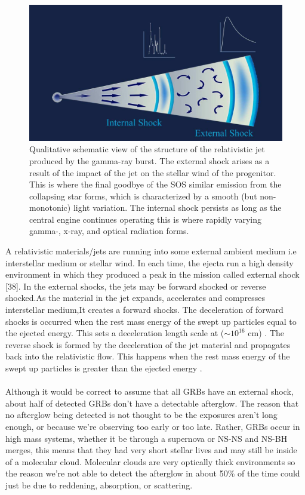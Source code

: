 \begin{figure}[h]
\begin{center}
\includegraphics[scale=0.3]{Figures/fig7.png}
\caption{Qualitative schematic view of the structure of the relativistic jet produced by the gamma-ray burst. The external shock arises as a result of the impact of the jet on the stellar wind of the progenitor. This is where the final goodbye of the SOS
similar emission from the collapsing star forms, which is characterized by a smooth (but non-monotonic) light variation. The internal shock persists as long as the central engine continues operating this is where rapidly varying gamma-, x-ray, and
optical radiation forms.}
\end{center}
\end{figure}
A relativistic materials/jets are running into some external ambient medium i.e interstellar medium or stellar wind. In each time, the ejecta run a high density environment in which they produced a peak in the mission called external shock [38]. In the external shocks, the jets may be forward shocked or reverse shocked.As the material in the jet expands, accelerates and compresses interstellar medium,It creates a forward shocks. The deceleration of forward shocks is occurred when the rest mass energy of the swept up particles equal to the ejected energy. This sets a deceleration length scale at ($\sim  10^{16} $ cm) . The reverse shock is formed by the deceleration of the jet material and propagates back into the relativistic flow. This happens when the rest mass energy of the swept up particles is greater than the ejected energy \citep{20}.\\\\
Although it would be correct to assume that all GRBs have an external shock, about half of detected GRBs don't have a detectable afterglow. The reason that no afterglow  being detected is not thought to be the exposures aren't long enough, or because we're observing too early or too late. Rather, GRBs occur in high mass systems, whether it be through a supernova or NS-NS and NS-BH merges, this means that they had very short stellar lives and may still be inside of a molecular cloud. Molecular clouds are very optically thick environments so the reason we're not able to detect the afterglow in about 50\%  of the time could just be due to reddening, absorption, or scattering.

